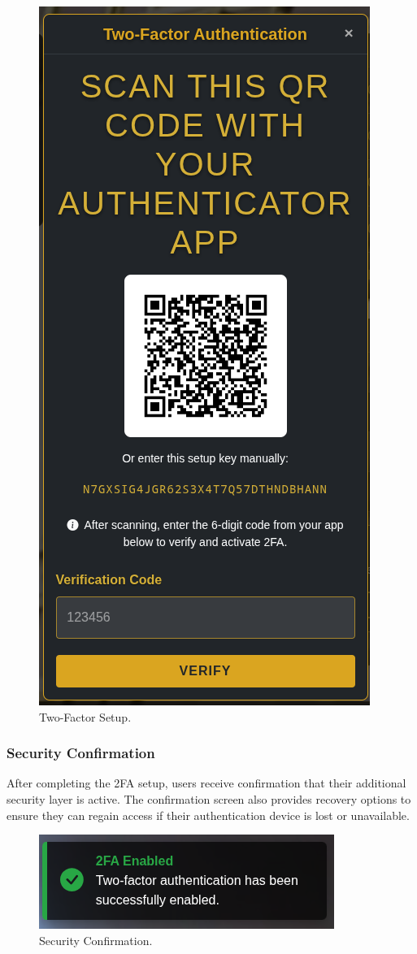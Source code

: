 \begin{figure}[H]
    \centering
    \includegraphics[width=0.65\linewidth]{Figures/images/new_images/Enabling2FA.png}
    \caption{Two-Factor Setup.} %
    \label{fig:2fa-setup-journey}
\end{figure}

\subsubsection{Security Confirmation} After completing the 2FA setup, users receive confirmation that their additional security layer is active. The confirmation screen also provides recovery options to ensure they can regain access if their authentication device is lost or unavailable.

\begin{figure}[H]
    \centering
    \includegraphics[width=0.65\linewidth]{Figures/images/new_images/2FASuccessfullyEnabled.png}
    \caption{Security Confirmation.} %
    \label{fig:2fa-confirmation-journey}
\end{figure}

